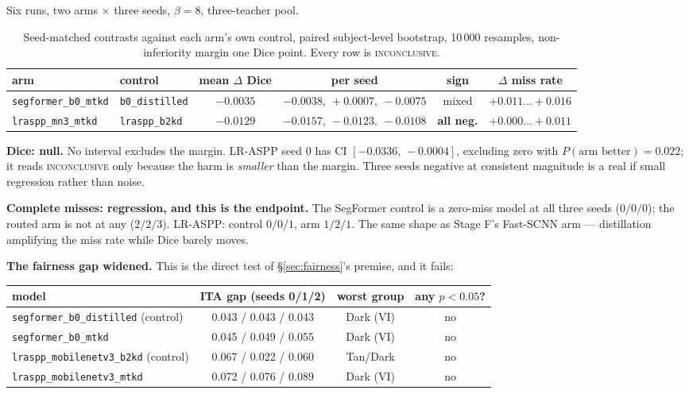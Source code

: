\documentclass[11pt,a4paper]{article}
\newcommand{\bad}[1]{\textcolor{warn}{\textbf{#1}}}
\begin{document}
Six runs, two arms $\times$ three seeds, $\beta = 8$, three-teacher pool.

\begin{table}[h]
\centering
\small
\caption{Seed-matched contrasts against each arm's own control, paired
subject-level bootstrap, 10\,000 resamples, non-inferiority margin one Dice
point. Every row is \textsc{inconclusive}.}
\begin{tabular}{llcccc}
\toprule
arm & control & mean $\Delta$ Dice & per seed & sign & $\Delta$ miss rate \\
\midrule
\texttt{segformer\_b0\_mtkd} & \texttt{b0\_distilled}
  & $-0.0035$ & $-0.0038,\ +0.0007,\ -0.0075$ & mixed & $+0.011\ldots+0.016$ \\
\texttt{lraspp\_mn3\_mtkd} & \texttt{lraspp\_b2kd}
  & \bad{$-0.0129$} & $-0.0157,\ -0.0123,\ -0.0108$ & \bad{all neg.} & $+0.000\ldots+0.011$ \\
\bottomrule
\end{tabular}
\end{table}

\textbf{Dice: null.} No interval excludes the margin. LR-ASPP seed 0 has
CI $[-0.0336,\,-0.0004]$, excluding zero with $P(\text{arm better}) = 0.022$;
it reads \textsc{inconclusive} only because the harm is \emph{smaller} than the
margin. Three seeds negative at consistent magnitude is a real if small
regression rather than noise.

\textbf{Complete misses: regression, and this is the endpoint.} The SegFormer
control is a zero-miss model at all three seeds ($0/0/0$); the routed arm is not
at any ($2/2/3$). LR-ASPP: control $0/0/1$, arm $1/2/1$. The same shape as Stage
F's Fast-SCNN arm --- distillation amplifying the miss rate while Dice barely
moves.

\textbf{The fairness gap widened.} This is the direct test of
\S\ref{sec:fairness}'s premise, and it fails:

\begin{center}\small
\begin{tabular}{lccc}
\toprule
model & ITA gap (seeds 0/1/2) & worst group & any $p<0.05$? \\
\midrule
\texttt{segformer\_b0\_distilled} (control) & 0.043 / 0.043 / 0.043 & Dark (VI) & no \\
\texttt{segformer\_b0\_mtkd}                & 0.045 / 0.049 / 0.055 & Dark (VI) & no \\
\texttt{lraspp\_mobilenetv3\_b2kd} (control)& 0.067 / 0.022 / 0.060 & Tan/Dark & no \\
\texttt{lraspp\_mobilenetv3\_mtkd}          & 0.072 / 0.076 / 0.089 & Dark (VI) & no \\
\bottomrule
\end{tabular}
\end{center}
\end{document}
